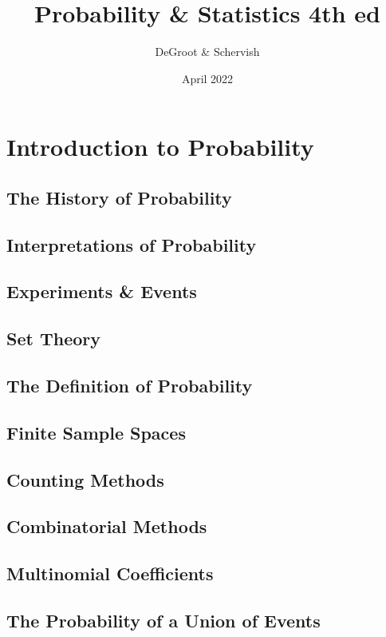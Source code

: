 \documentclass{article}
\title{Probability \& Statistics 4th ed}
\author{DeGroot & Schervish}
\date{April 2022}
\begin{document}
	
	\tableofcontents
	
	\section{Introduction to Probability}
		\subsection{The History of Probability}
		
		\subsection{Interpretations of Probability}
		
		\subsection{Experiments \& Events}
		
		\subsection{Set Theory}

		\subsection*{The Definition of Probability}

		\subsection*{Finite Sample Spaces}

		\subsection*{Counting Methods}

		\subsection*{Combinatorial Methods}

		\subsection*{Multinomial Coefficients}

		\subsection*{The Probability of a Union of Events}
\end{document}
